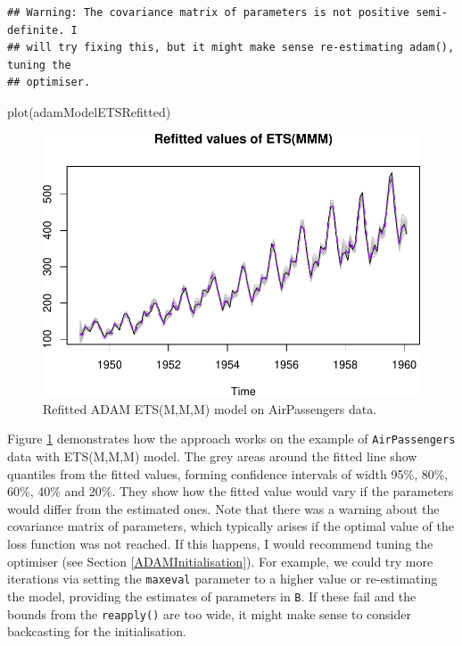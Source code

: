 \documentclass[
]{book}
\newenvironment{Shaded}{\begin{snugshade}}{\end{snugshade}}
\newcommand{\FunctionTok}[1]{\textcolor[rgb]{0.00,0.00,0.00}{#1}}
\newcommand{\NormalTok}[1]{#1}
\theoremstyle{definition}
\theoremstyle{definition}
\theoremstyle{definition}
\theoremstyle{definition}
\theoremstyle{remark}
\begin{document}
\begin{verbatim}
## Warning: The covariance matrix of parameters is not positive semi-definite. I
## will try fixing this, but it might make sense re-estimating adam(), tuning the
## optimiser.
\end{verbatim}

\begin{Shaded}
\begin{Highlighting}[]
\FunctionTok{plot}\NormalTok{(adamModelETSRefitted)}
\end{Highlighting}
\end{Shaded}

\begin{figure}
\centering
\includegraphics{Svetunkov--2022----ADAM_files/figure-latex/adamETSRefitted-1.pdf}
\caption{\label{fig:adamETSRefitted}Refitted ADAM ETS(M,M,M) model on AirPassengers data.}
\end{figure}

Figure \ref{fig:adamETSRefitted} demonstrates how the approach works on the example of \texttt{AirPassengers} data with ETS(M,M,M) model. The grey areas around the fitted line show quantiles from the fitted values, forming confidence intervals of width 95\%, 80\%, 60\%, 40\% and 20\%. They show how the fitted value would vary if the parameters would differ from the estimated ones. Note that there was a warning about the covariance matrix of parameters, which typically arises if the optimal value of the loss function was not reached. If this happens, I would recommend tuning the optimiser (see Section \ref{ADAMInitialisation}). For example, we could try more iterations via setting the \texttt{maxeval} parameter to a higher value or re-estimating the model, providing the estimates of parameters in \texttt{B}. If these fail and the bounds from the \texttt{reapply()} are too wide, it might make sense to consider backcasting for the initialisation.
\end{document}
